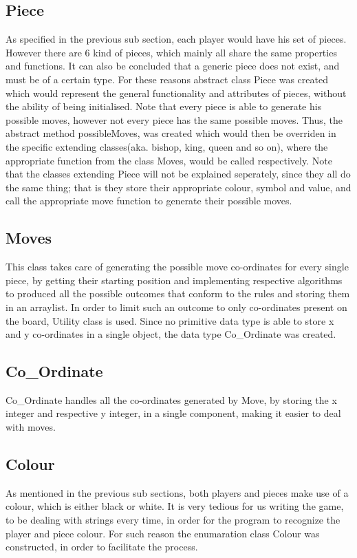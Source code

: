 \documentclass[12pt, A4]{report}
\begin{document}
		\subsection*{Piece}
		As specified in the previous sub section, each player would have his set of pieces. However there are 6 kind of pieces, which mainly all share the same properties and functions. It can also be concluded that a generic piece does not exist, and must be of a certain type. For these reasons abstract class Piece was created which would represent the general functionality and attributes of pieces, without the ability of being initialised. Note that every piece is able to generate his possible moves, however not every piece has the same possible moves. Thus, the abstract method possibleMoves, was created which would then be overriden in the specific extending classes(aka. bishop, king, queen and so on), where the appropriate function from the class Moves, would be called respectively. Note that the classes extending Piece will not be explained seperately, since they all do the same thing; that is they store their appropriate colour, symbol and value, and call the appropriate move function to generate their possible moves.

		\subsection*{Moves}
		This class takes care of generating the possible move co-ordinates for every single piece, by getting their starting position and implementing respective algorithms to produced all the possible outcomes that conform to the rules and storing them in an arraylist. In order to limit such an outcome to only co-ordinates present on the board, Utility class is used. Since no primitive data type is able to store x and y co-ordinates in a single object, the data type Co\_Ordinate was created.

		\subsection*{Co\_Ordinate}
		Co\_Ordinate handles all the co-ordinates generated by Move, by storing the x integer and respective y integer, in a single component, making it easier to deal with moves.

		\subsection*{Colour}
		As mentioned in the previous sub sections, both players and pieces make use of a colour, which is either black or white. It is very tedious for us writing the game, to be dealing with strings every time, in order for the program to recognize the player and piece colour. For such reason the enumaration class Colour was constructed, in order to facilitate the process.
\end{document}
